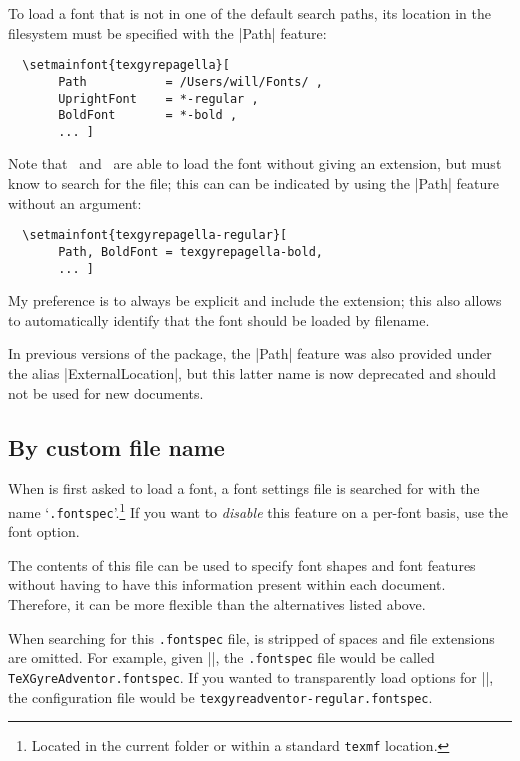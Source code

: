 \documentclass[a4paper]{l3doc}
\begin{document}
To load a font that is not in one of the default search paths, its location
in the filesystem must be specified with the |Path| feature:
\begin{Verbatim}
  \setmainfont{texgyrepagella}[
       Path           = /Users/will/Fonts/ ,
       UprightFont    = *-regular ,
       BoldFont       = *-bold ,
       ... ]
\end{Verbatim}
Note that \XeTeX\ and \LuaTeX\ are able to load the font without giving an
extension, but  must know to search for the file; this can can
be indicated by using the |Path| feature without an argument:
\begin{Verbatim}
  \setmainfont{texgyrepagella-regular}[
       Path, BoldFont = texgyrepagella-bold,
       ... ]
\end{Verbatim}
My preference is to always be explicit and include the extension; this also allows  to automatically identify that the font should be loaded by filename.

In previous versions of the package, the |Path| feature was also provided under the alias |ExternalLocation|, but this latter name is now deprecated and should not be used for new documents.


\subsection{By custom file name}

When  is first asked to load a font, a font settings file is searched
for with the name `\texttt{.fontspec}'.\footnote{Located in the current folder or within a standard \texttt{texmf} location.}
If you want to \emph{disable} this feature on a per-font basis, use the  font option.

The contents of this file can be used to specify font shapes and font features without having to have this information present within each document.
Therefore, it can be more flexible than the alternatives listed above.

When searching for this \texttt{.fontspec} file,  is stripped of spaces and file extensions are omitted.
For example, given |\setmainfont{TeX Gyre Adventor}|, the \texttt{.fontspec} file would be
called \texttt{TeXGyreAdventor.fontspec}.
If you wanted to transparently load options for |\setmainfont{texgyreadventor-regular.otf}|, the configuration
file would be \texttt{texgyreadventor-regular.fontspec}.
\end{document}
